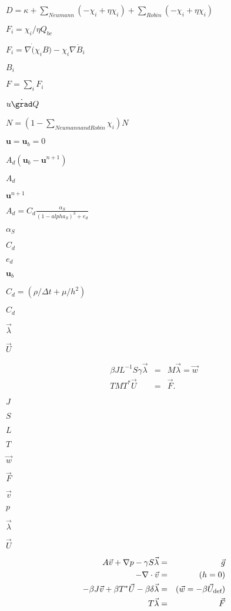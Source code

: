\documentclass{article}
\begin{document}
$ D = \kappa + \sum_{Neumann} (-\chi_i + \eta \chi_i) + \sum_{Robin} (-\chi_i + \eta \chi_i)$
\pagebreak

$ F_i = \chi_i/\eta Q_{bc}$
\pagebreak

$ F_i = \nabla \dot (\chi_i B) - \chi_i \nabla \dot B_i $
\pagebreak

$B_i$
\pagebreak

$F = \sum_{i} F_i$
\pagebreak

$ u \dot \grad Q$
\pagebreak

$ N = (1-\sum_{Neumann and Robin} \chi_i) N$
\pagebreak

$ \bm{u}=\bm{u}_b = 0$
\pagebreak

$ A_d(\bm{u}_b - \bm{u}^{n+1}) $
\pagebreak

$A_d $
\pagebreak

$ \bm{u}^{n+1} $
\pagebreak

$ A_d =
C_d\frac{\alpha_S}{(1-alpha_S)^3+e_d}$
\pagebreak

$ \alpha_S $
\pagebreak

$ C_d$
\pagebreak

$ e_d$
\pagebreak

$\bm{u}_b$
\pagebreak

$C_d = ( \rho / \Delta t + \mu / h^2)$
\pagebreak

$C_d$
\pagebreak

$ \vec{\lambda}$
\pagebreak

$ \vec{U}$
\pagebreak

\begin{eqnarray*}
     \beta J L^{-1} S \gamma \vec{\lambda} &=& M \vec{\lambda} = \vec{w} \\
     T M T^* \vec{U} &=& \vec{F}.
\end{eqnarray*}
\pagebreak

$ J $
\pagebreak

$ S $
\pagebreak

$ L $
\pagebreak

$ T $
\pagebreak

$ \vec{w} $
\pagebreak

$ \vec{F} $
\pagebreak

$ \vec{v} $
\pagebreak

$ p $
\pagebreak

$ \vec{\lambda} $
\pagebreak

$  \vec{U} $
\pagebreak

\begin{eqnarray*}
   A \vec{v} + \nabla p - \gamma S \vec{\lambda}   &=& \vec{g}  \\
   -\nabla \cdot \vec{v}                           &=&  (h = 0) \\
   -\beta J \vec{v} + \beta T^{*} \vec{U} -\beta \delta \vec{\lambda} &=&  (\vec{w} = -\beta \vec{U}_{\mbox{\scriptsize
def}}) \\
   T \vec{\lambda} &=&  \vec{F}
   \end{eqnarray*}
\pagebreak
\end{document}
